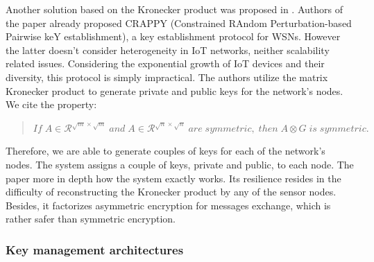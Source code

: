 Another solution based on the Kronecker product was proposed in \cite{tsai_key_2017}. Authors of the paper already proposed CRAPPY (Constrained RAndom Perturbation-based Pairwise keY establishment), a key establishment protocol for WSNs. However the latter doesn’t consider heterogeneity in IoT networks, neither scalability related issues. Considering the exponential growth of IoT devices and their diversity, this protocol is simply impractical. The authors utilize the matrix Kronecker product to generate private and public keys for the network’s nodes. We cite the property:

\begin{quote}
	\begin{math}
		If\; A \in \mathcal{R}^{\sqrt{m} \times \sqrt{m}} \; and\; A \in \mathcal{R}^{\sqrt{n} \times \sqrt{n}} \; are\; symmetric,\; then\; A \otimes G\; is\; symmetric. 
	\end{math}
\end{quote}

Therefore, we are able to generate couples of keys for each of the network’s nodes. The system assigns a couple of keys, private and public, to each node. The paper more in depth how the system exactly works. Its resilience resides in the difficulty of reconstructing the Kronecker product by any of the sensor nodes. Besides, it factorizes asymmetric encryption for messages exchange, which is rather safer than symmetric encryption.

\subsubsection{Key management architectures}

